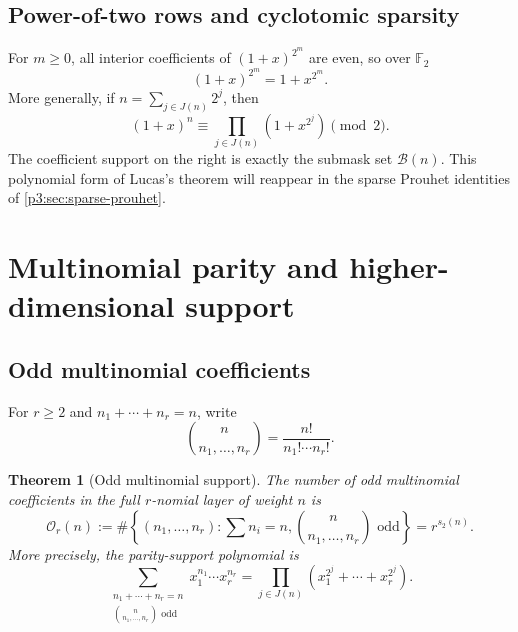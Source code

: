 \documentclass[11pt,oneside]{article}
\newtheorem{theorem}{Theorem}[section]
\theoremstyle{definition}
\theoremstyle{remark}
\newcommand{\Ftwo}{\mathbb F_2}
\newcommand{\bitsum}{s_2}
\begin{document}
\subsection{Power-of-two rows and cyclotomic sparsity}

For $m\ge0$, all interior coefficients of $(1+x)^{2^m}$ are even, so over
$\Ftwo$
\begin{equation}\label{p3:eq:freshman-dream}
 (1+x)^{2^m}=1+x^{2^m}.
\end{equation}
More generally, if $n=\sum_{j\in J(n)}2^j$, then
\begin{equation}\label{p3:eq:lucas-polynomial}
 (1+x)^n
 \equiv\prod_{j\in J(n)}(1+x^{2^j})
 \pmod2.
\end{equation}
The coefficient support on the right is exactly the submask set
$\mathcal B(n)$.  This polynomial form of Lucas's theorem will reappear in the
sparse Prouhet identities of \cref{p3:sec:sparse-prouhet}.

\section{Multinomial parity and higher-dimensional support}

\subsection{Odd multinomial coefficients}

For $r\ge2$ and $n_1+\cdots+n_r=n$, write
\[
 \binom{n}{n_1,\ldots,n_r}=\frac{n!}{n_1!\cdots n_r!}.
\]

\begin{theorem}[Odd multinomial support]\label{p3:thm:odd-multinomial}
The number of odd multinomial coefficients in the full $r$-nomial layer of
weight $n$ is
\begin{equation}\label{p3:eq:odd-multinomial-count}
 \mathcal O_r(n)
 :=\#\left\{(n_1,\ldots,n_r):\sum n_i=n,
       \binom{n}{n_1,\ldots,n_r}\text{ odd}\right\}
 =r^{\bitsum(n)}.
\end{equation}
More precisely, the parity-support polynomial is
\begin{equation}\label{p3:eq:multinomial-support-polynomial}
 \sum_{\substack{n_1+\cdots+n_r=n\\
       \binom{n}{n_1,\ldots,n_r}\text{ odd}}}
 x_1^{n_1}\cdots x_r^{n_r}
 =\prod_{j\in J(n)}
   \left(x_1^{2^j}+\cdots+x_r^{2^j}\right).
\end{equation}
\end{theorem}
\end{document}
